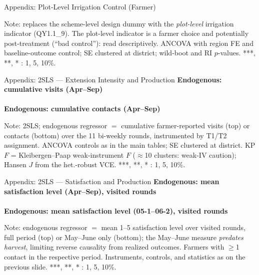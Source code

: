 \documentclass[aspectratio=169]{beamer}
\begin{document}
\begin{frame}{Appendix: Plot-Level Irrigation Control (Farmer)}
	\centering
	\scalebox{0.46}{}
	\begin{tablenotes}
		\scriptsize
		\item Note: replaces the scheme-level design dummy with the \emph{plot-level} irrigation
		indicator (QY1.1\_9). The plot-level indicator is a farmer choice and potentially
		post-treatment (``bad control''): read descriptively. ANCOVA with region FE and
		baseline-outcome control; SE clustered at district; wild-boot and RI $p$-values.
		***, **, * : 1, 5, 10\%.
	\end{tablenotes}
\end{frame}

\begin{frame}{Appendix: 2SLS --- Extension Intensity and Production}
	\centering
	{\footnotesize\textbf{Endogenous: cumulative visits (Apr--Sep)}}\\[1pt]
	\scalebox{0.46}{}\\[4pt]
	{\footnotesize\textbf{Endogenous: cumulative contacts (Apr--Sep)}}\\[1pt]
	\scalebox{0.46}{}
	\begin{tablenotes}
		\scriptsize
		\item Note: 2SLS; endogenous regressor $=$ cumulative farmer-reported visits (top) or
		contacts (bottom) over the 11 bi-weekly rounds, instrumented by T1/T2 assignment.
		ANCOVA controls as in the main tables; SE clustered at district. KP $F$ = Kleibergen--Paap
		weak-instrument $F$ ($\approx$10 clusters: weak-IV caution); Hansen $J$ from the
		het.-robust VCE. ***, **, * : 1, 5, 10\%.
	\end{tablenotes}
\end{frame}

\begin{frame}{Appendix: 2SLS --- Satisfaction and Production}
	\centering
	{\footnotesize\textbf{Endogenous: mean satisfaction level (Apr--Sep), visited rounds}}\\[1pt]
	\scalebox{0.46}{}\\[4pt]
	{\footnotesize\textbf{Endogenous: mean satisfaction level (05-1--06-2), visited rounds}}\\[1pt]
	\scalebox{0.46}{}
	\begin{tablenotes}
		\scriptsize
		\item Note: endogenous regressor $=$ mean 1--5 satisfaction level over visited rounds,
		full period (top) or May--June only (bottom); the May--June measure \emph{predates
		harvest}, limiting reverse causality from realized outcomes. Farmers with $\geq$1 contact
		in the respective period. Instruments, controls, and statistics as on the previous slide.
		***, **, * : 1, 5, 10\%.
	\end{tablenotes}
\end{frame}
\end{document}

